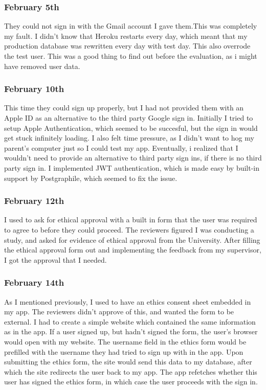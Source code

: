 \documentclass{l4proj}
\begin{document}
\subsubsection{February 5th}
They could not sign in with the Gmail account I gave them.This was completely my fault. I didn't know that Heroku restarts every day, which meant that my production database was rewritten every day with test day. This also overrode the test user. This was a good thing to find out before the evaluation, as i might have removed user data.

\subsubsection{February 10th}
This time they could sign up properly, but I had not provided them with an Apple ID as an alternative to the third party Google sign in. Initially I tried to setup Apple Authentication, which seemed to be succesful, but the sign in would get stuck infinitely loading. I also felt time pressure, as I didn't want to hog my parent's computer just so I could test my app. Eventually, i realized that I wouldn't need to provide an alternative to third party sign ins, if there is no third party sign in. I implemented JWT authentication, which is made easy by built-in support by Postgraphile, which seemed to fix the issue.

\subsubsection{February 12th}
I used to ask for ethical approval with a built in form that the user was required to agree to before they could proceed. The reviewers figured I was conducting a study, and asked for evidence of ethical approval from the University. After filling the ethical approval form out and implementing the feedback from my supervisor, I got the approval that I needed.

\subsubsection{February 14th}
As I mentioned previously, I used to have an ethics consent sheet embedded in my app. The reviewers didn't approve of this, and wanted the form to be external. I had to create a simple website which contained the same information as in the app. If a user signed up, but hadn't signed the form, the user's browser would open with my website. The username field in the ethics form would be prefilled with the username they had tried to sign up with in the app. Upon submitting the ethics form, the site would send this data to my database, after which the site redirects the user back to my app. The app refetches whether this user has signed the ethics form, in which case the user proceeds with the sign in.
\end{document}
